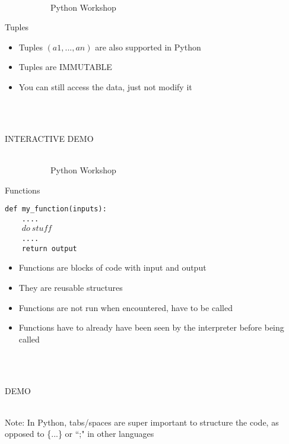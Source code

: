 \documentclass[10pt, xcolor=dvisnames]{beamer}
\begin{document}
\begin{frame}{{\tiny \ \\\vspace{-13pt} \ \ \ \ \ \ \ \ \ \ \ Python Workshop}\\ \centerline{Tuples}}
\vspace*{-50pt}

\begin{itemize}
\item Tuples $(a1,...,an)$ are also supported in Python
\item Tuples are IMMUTABLE
\item You can still access the data, just not modify it
\end{itemize}


\ \\
\ \\
\centerline{INTERACTIVE DEMO}


\end{frame}





\begin{frame}{{\tiny \ \\\vspace{-13pt} \ \ \ \ \ \ \ \ \ \ \ Python Workshop}\\ \centerline{Functions}}
\vspace*{-50pt}

\begin{center}\texttt{def my\_function(inputs):\\
\ \ \ \ ....\\
\ \ \ \ $do\ stuff$\\
\ \ \ \ .... \\
\ \ \ \ return output
}\end{center}

\begin{itemize}
\item Functions are blocks of code with input and output
\item They are reusable structures
\item Functions are not run when encountered, have to be called
\item Functions have to already have been seen by the interpreter before being called
\end{itemize}


\ \\
\ \\
\centerline{DEMO}

\ \\
Note: In Python, tabs/spaces are super important to structure the code, as opposed to \{...\} or ``;" in other languages

\end{frame}
\end{document}
